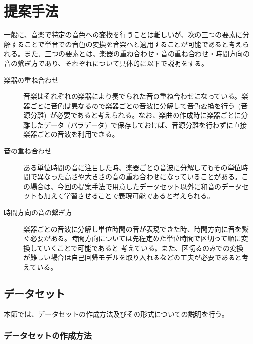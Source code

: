 \chapter{提案手法}

一般に、音楽で特定の音色への変換を行うことは難しいが、次の三つの要素に分解することで単音での音色の変換を音楽へと適用することが可能であると考えられる。また、三つの要素とは、楽器の重ね合わせ・音の重ね合わせ・時間方向の音の繋ぎ方であり、それぞれについて具体的に以下で説明をする。

\begin{description}

\item[楽器の重ね合わせ]\mbox{}

音楽はそれぞれの楽器により奏でられた音の重ね合わせになっている。楽器ごとに音色は異なるので楽器ごとの音波に分解して音色変換を行う~(音源分離)~が必要であると考えられる。なお、楽曲の作成時に楽器ごとに分離したデータ~(パラデータ)~で保存しておけば、音源分離を行わずに直接楽器ごとの音波を利用できる。

\item[音の重ね合わせ]\mbox{}

ある単位時間の音に注目した時、楽器ごとの音波に分解してもその単位時間で異なった高さや大きさの音の重ね合わせになっていることがある。この場合は、今回の提案手法で用意したデータセット以外に和音のデータセットも加えて学習させることで表現可能であると考えられる。

\item[時間方向の音の繋ぎ方]\mbox{}


楽器ごとの音波に分解し単位時間の音が表現できた時、時間方向に音を繋ぐ必要がある。時間方向については先程定めた単位時間で区切って順に変換していくことで可能であると 考えている。また、区切るのみでの変換が難しい場合は自己回帰モデルを取り入れるなどの工夫が必要であると考えている。

\end{description}


\section{データセット}

本節では、データセットの作成方法及びその形式についての説明を行う。

\subsection{データセットの作成方法}

